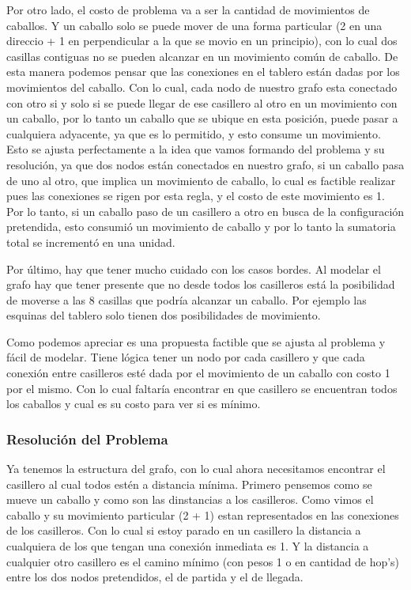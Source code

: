 Por otro lado, el costo de problema va a ser la cantidad de movimientos de caballos. Y un caballo solo se puede mover de una forma particular (2 en una direccio + 1 en perpendicular a la que se movio en un principio), con lo cual dos casillas contiguas no se pueden alcanzar en un movimiento com\'un de caballo.
De esta manera podemos pensar que las conexiones en el tablero est\'an dadas por los movimientos del caballo. Con lo cual, cada nodo de nuestro grafo esta conectado con otro si y solo si se puede llegar de ese casillero al otro en un movimiento con un caballo, por lo tanto un caballo que se ubique en esta posici\'on, puede pasar a cualquiera adyacente, ya que es lo permitido, y esto consume un movimiento.
Esto se ajusta perfectamente a la idea que vamos formando del problema y su resoluci\'on, ya que dos nodos est\'an conectados en nuestro grafo, si un caballo pasa de uno al otro, que implica un movimiento de caballo, lo cual es factible realizar pues las conexiones se rigen por esta regla, y el costo de este movimiento es 1. Por lo tanto, si un caballo paso de un casillero a otro en busca de la configuraci\'on pretendida, esto consumi\'o un movimiento de caballo y por lo tanto la sumatoria total se increment\'o en una unidad.

Por \'ultimo, hay que tener mucho cuidado con los casos bordes. Al modelar el grafo hay que tener presente que no desde todos los casilleros est\'a la posibilidad de moverse a las 8 casillas que podr\'ia alcanzar un caballo. Por ejemplo las esquinas del tablero solo tienen dos posibilidades de movimiento.

Como podemos apreciar es una propuesta factible que se ajusta al problema y f\'acil de modelar. Tiene l\'ogica tener un nodo por cada casillero y que cada conexi\'on entre casilleros est\'e dada por el movimiento de un caballo con costo 1 por el mismo. Con lo cual faltar\'ia encontrar en que casillero se encuentran todos los caballos y cual es su costo para ver si es m\'inimo.


\subsubsection{Resoluci\'on del Problema}

Ya tenemos la estructura del grafo, con lo cual ahora necesitamos encontrar el casillero al cual todos est\'en a distancia m\'inima.
Primero pensemos como se mueve un caballo y como son las dinstancias a los casilleros.
Como vimos el caballo y su movimiento particular (2 + 1) estan representados en las conexiones de los casilleros. Con lo cual si estoy parado en un casillero la distancia a cualquiera de los que tengan una conexi\'on inmediata es 1. Y la distancia a cualquier otro casillero es el camino m\'inimo (con pesos 1 o en cantidad de hop's) entre los dos nodos pretendidos, el de partida y el de llegada.

